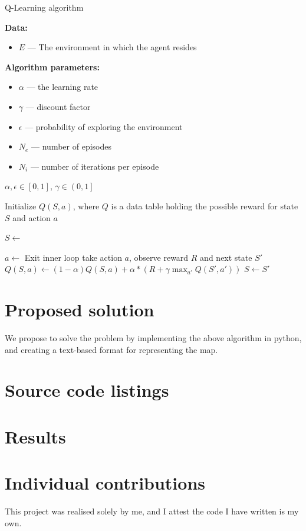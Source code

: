 \documentclass[12pt]{article}
\begin{document}
\begin{algorithm}[H]
  \caption{Q-Learning algorithm}
  \textbf{Data:}
  \begin{itemize}
    \item $E$ --- The environment in which the agent resides
  \end{itemize}
  \textbf{Algorithm parameters:}
  \begin{itemize}
    \item $\alpha$ --- the learning rate
    \item $\gamma$ --- discount factor
    \item $\epsilon$ --- probability of exploring the environment
    \item $N_e$ --- number of episodes
    \item $N_i$ --- number of iterations per episode
  \end{itemize}
  \begin{algorithmic}
    \Require $\alpha, \epsilon \in \left[0, 1 \right]$, $\gamma \in \left(0, 1\right]$

    \State Initialize $Q(S, a)$, where $Q$ is a data table holding the possible reward for state $S$ and action $a$

    \State $S \gets$ 

    \State $a \gets$ 
    \State Exit inner loop
    \EndIf
    \State take action $a$, observe reward $R$ and next state $S'$
    \State $Q(S, a) \gets (1 - \alpha)Q(S, a) + \alpha * (R + \gamma \max_{a'}{Q(S', a')})$
    \State $S \gets S'$
    \EndFor

    \EndFor

    \EndProcedure
  \end{algorithmic}
\end{algorithm}

\section{Proposed solution}
We propose to solve the problem by implementing the above algorithm in python, and creating
a text-based format for representing the map.
\section{Source code listings}

\section{Results}

\newpage




\section*{Individual contributions}
This project was realised solely by me, and I attest the code I have written is my own.
\end{document}
